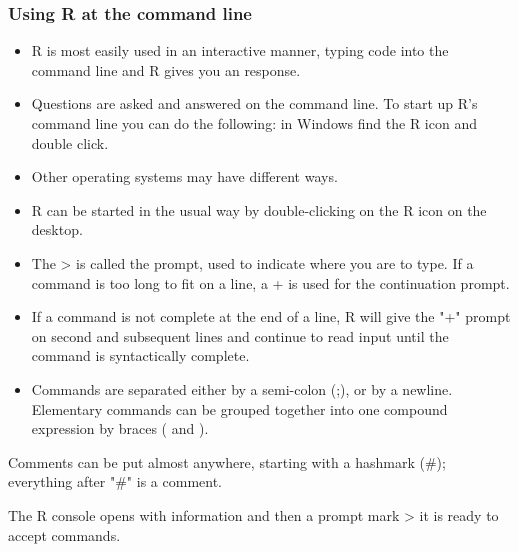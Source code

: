 \begin{frame}
\frametitle{Using R at the command line}
\begin{itemize}
\item R is most easily used in an interactive manner, typing code into the command line and R gives you an response. 

\item Questions are asked and answered on the command line. To start up R's command line you can do the following: in Windows find the R icon and double click. 

\item Other operating systems may have different ways.

\item R can be started in the usual way by double-clicking on the R icon on the desktop.
\end{itemize}
\end{frame}
\begin{frame}
\begin{itemize}
\item  The > is called the prompt, used to indicate where you are to type. If a command is too long to fit on a line, a + is used for the continuation prompt.
\item If a command is not complete at the end of a line, R will give the "+" prompt on second and subsequent lines and continue to read input until the command is syntactically complete.
\item Commands are separated either by a semi-colon (;), or by a newline. Elementary commands can be grouped together into one compound expression by braces ({ and }). 
\end{itemize}

\end{frame}
\begin{frame}


Comments can be put almost anywhere, starting with a hashmark (#); everything after "#" is a comment.
\end{frame}
\begin{frame}
The R console opens with information and then a prompt mark  >  it is ready to accept commands.
\end{frame}
